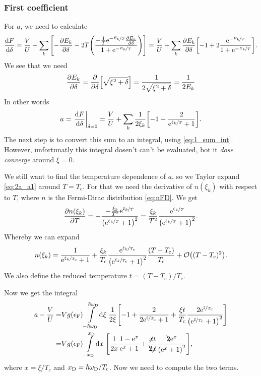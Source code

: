 \documentclass[11pt,letter, swedish, english
]{article}
\newcommand{\Tc}{\ensuremath{T_{\text{c}}}}
\newcommand{\eF}{\ensuremath{\epsilon_{\text{F}}}}
\newcommand{\wD}{\ensuremath{\omega_{\text{D}}}}
\begin{document}
\subsubsection{First coefficient}
For $a$, we need to calculate
\begin{equation}
\dv{F}{\delta}=\frac{V}{U}
+\sum_k\qty[-\pdv{E_k}{\delta}
-2T\qty(\frac{-\frac{1}{T}\mathrm{e}^{-\nicefrac{E_k}{T}}\pdv{E_k}{\delta}}
{1+\mathrm{e}^{-\nicefrac{E_k}{T}}})]
=\frac{V}{U}
+\sum_k\pdv{E_k}{\delta}\qty[-1
+2\frac{\mathrm{e}^{-\nicefrac{E_k}{T}}}{1+\mathrm{e}^{-\nicefrac{E_k}{T}}}].
\end{equation}
We see that we need
\begin{equation}
\pdv{E_k}{\delta}=\pdv{\delta}\qty[\sqrt{\xi^2+\delta}]
=\frac{1}{2\sqrt{\xi^2+\delta}}=\frac{1}{2E_k}
\end{equation}
In other words
\begin{equation}\label{eq:2a_a1}
a=\eval{\dv{F}{\delta}}_{\delta=0}
=\frac{V}{U}
+\sum_k\frac{1}{2\xi_k}\qty[-1
+\frac{2}{\ee^{\nicefrac{\xi_k}{T}}+1}].
\end{equation}
The next step is to convert this sum to an integral, using
\eqref{eq:1_sum_int}. However, unfortunatly this integral dosen't can't be
evaluated, bot it \emph{dose converge} around $\xi=0$.

We still want to find the temperature dependence of $a$, so we Taylor
expand \eqref{eq:2a_a1} around $T=\Tc$. For that we need the
derivative of $n(\xi_k)$ with respect to $T$, where $n$ is the
Fermi-Dirac distribution \eqref{eq:nFD}. We get
\begin{equation}
\pdv{n(\xi_k)}{T}=-\frac{-\frac{\xi_k}{T^2}\mathrm{e}^{\nicefrac{\xi_k}{T}}}{\qty(\mathrm{e}^{\nicefrac{\xi_k}{T}}+1)^2}
=\frac{\xi_k}{T^2}\frac{\mathrm{e}^{\nicefrac{\xi_k}{T}}}{\qty(\mathrm{e}^{\nicefrac{\xi_k}{T}}+1)^2}.
\end{equation}
Whereby we can expand
\begin{equation}
n(\xi_k)=\frac{1}{\ee^{\nicefrac{\xi_k}{\Tc}}+1}
+\frac{\xi_k}{\Tc}\frac{\ee^{\nicefrac{\xi_k}{\Tc}}}
{\qty(\ee^{\nicefrac{\xi_k}{\Tc}}+1)^2}
\frac{(T-\Tc)}{\Tc} + \order{(T-\Tc)^2}.
\end{equation}
We also define the reduced temperature $t=(T-\Tc)/\Tc$.

Now we get the integral
\begin{equation}
\begin{aligned}
a-\frac{V}{U}=&
Vg(\eF)\int_{-\hbar\wD}^{\hbar\wD}\!\rd\xi\;
\frac{1}{2\xi}\qty[-1
+\frac{2}{2\ee^{\nicefrac{\xi}{\Tc}}+1}
+\frac{\xi t}{\Tc}\frac{2\ee^{\nicefrac{\xi}{\Tc}}}
{\qty(\ee^{\nicefrac{\xi}{\Tc}}+1)^2}]\\
=&Vg(\eF)\int_{-\xD}^{\xD}\!\rd{x}\;
\qty[\frac{1}{2x}\frac{1-\ee^x}{\ee^x+1}
+\frac{\cancel{x}t}{\bcancel{2}\cancel{x}}
\frac{\bcancel{2}\ee^{x}}{\qty(\ee^{x}+1)^2}],
\end{aligned}
\end{equation}
where $x=\xi/\Tc$ and $\xD=\hbar\wD/\Tc$. Now we need to compute the
two terms.
\end{document}

